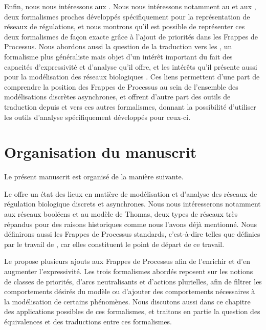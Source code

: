 Enfin, nous nous intéressons aux .
Nous nous intéressons notamment au  et aux ,
deux formalismes proches
développés spécifiquement pour la représentation de réseaux de régulations,
et nous montrons qu'il est possible de représenter ces deux formalismes de façon exacte
grâce à l'ajout de priorités dans les Frappes de Processus.
Nous abordons aussi la question de la traduction vers les ,
un formalisme plus généraliste mais objet d'un intérêt important du fait des
capacités d'expressivité et d'analyse qu'il offre,
et les intérêts qu'il présente aussi pour la modélisation des réseaux biologiques
\cite{petri1962kommunikation,Chaouiya07petrinet}.
Ces liens permettent d'une part de comprendre la position des Frappes de Processus au sein
de l'ensemble des modélisations discrètes asynchrones,
et offrent d'autre part des outils de traduction depuis et vers ces autres formalismes,
donnant la possibilité d'utiliser les outils d'analyse spécifiquement développés pour ceux-ci.








\section{Organisation du manuscrit}

Le présent manuscrit est organisé de la manière suivante.

Le  offre un état des lieux en matière de modélisation et d'analyse
des réseaux de régulation biologique discrets et asynchrones.
Nous nous intéresserons notamment aux réseaux booléens et au modèle de Thomas,
deux types de réseaux très répandus pour des raisons historiques
comme nous l'avons déjà mentionné.
Nous définirons aussi les Frappes de Processus standards,
c'est-à-dire telles que définies par le travail de ,
car elles constituent le point de départ de ce travail.

Le  propose plusieurs ajouts aux Frappes de Processus afin de l'enrichir
et d'en augmenter l'expressivité.
Les trois formalismes abordés reposent sur les notions de classes de priorités,
d'arcs neutralisants et d'actions plurielles,
afin de filtrer les comportements désirés du modèle
ou d'ajouter des comportements nécessaires à la modélisation de certains phénomènes.
Nous discutons aussi dans ce chapitre des applications possibles de ces formalismes,
et traitons en partie la question des équivalences et des traductions entre ces formalismes.

